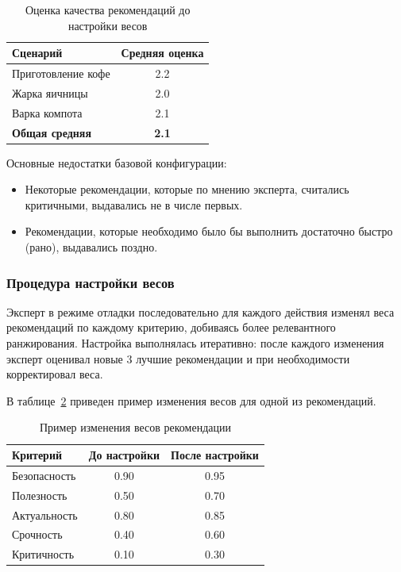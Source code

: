 \begin{table}[H]
\centering
\caption{Оценка качества рекомендаций до настройки весов}
\label{tab:before_tuning}
\begin{tabular}{|l|c|}
\hline
\textbf{Сценарий} & \textbf{Средняя оценка} \\
\hline
Приготовление кофе & 2.2 \\
\hline
Жарка яичницы & 2.0 \\
\hline
Варка компота & 2.1 \\
\hline
\textbf{Общая средняя} & \textbf{2.1} \\
\hline
\end{tabular}
\end{table}

Основные недостатки базовой конфигурации:
\begin{itemize}
\item Некоторые рекомендации, которые по мнению эксперта, считались критичными, выдавались не в числе первых.
\item Рекомендации, которые необходимо было бы выполнить достаточно быстро (рано), выдавались поздно.
\end{itemize}

\subsubsection*{Процедура настройки весов}

Эксперт в режиме отладки последовательно для каждого действия изменял веса рекомендаций по каждому критерию, добиваясь более релевантного ранжирования. 
Настройка выполнялась итеративно: после каждого изменения эксперт оценивал новые 3 лучшие рекомендации и при необходимости корректировал веса.

В таблице~\ref{tab:changes_example} приведен пример изменения весов для одной из рекомендаций.

\begin{table}[H]
\centering
\caption{Пример изменения весов рекомендации}
\label{tab:changes_example}
\begin{tabular}{|l|c|c|}
\hline
\textbf{Критерий} & \textbf{До настройки} & \textbf{После настройки} \\
\hline
Безопасность & 0.90 & 0.95 \\
\hline
Полезность & 0.50 & 0.70 \\
\hline
Актуальность & 0.80 & 0.85 \\
\hline
Срочность & 0.40 & 0.60 \\
\hline
Критичность & 0.10 & 0.30 \\
\hline
\end{tabular}
\end{table}

